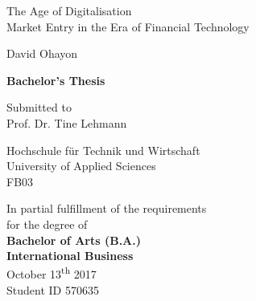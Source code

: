 \documentclass[11pt,a4paper]{article}
\begin{document}
  
  
 
 

\begin{titlepage}    
\begin{center} 

\vspace*{2cm}

{\Huge{The Age of Digitalisation}} \\
\vspace*{0.4cm} 
\LARGE{Market Entry in the Era of Financial Technology}

\vspace*{1.5cm} 

\Large{David Ohayon}\\


\vspace*{1.5cm}

\large{
\textbf{Bachelor's Thesis}\\
} 
      
\vspace*{1cm}

\large{Submitted to\\
Prof. Dr. Tine Lehmann\\}

\vspace*{1.0cm}
\large{Hochschule für Technik und Wirtschaft\\}
\large{University of Applied Sciences\\}
\large{FB03}
\vspace*{1.0cm}

\vspace*{2cm}
\small{In partial fulfillment of the requirements\\
for the degree of \\
\vspace{4mm}
\normalsize \textbf{Bachelor of Arts (B.A.) \\
International Business}\\
}
\vspace{1cm}
\large{October 13\textsuperscript{th} 2017}\\
\large{Student ID 570635}\\
      
\end{center}
\end{titlepage}
\end{document}
